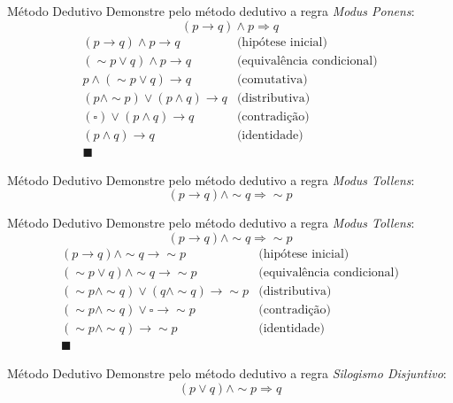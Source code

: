 \begin{frame}[t]{Método Dedutivo}
	Demonstre pelo método dedutivo a regra {\em Modus Ponens}: $$(p \rightarrow q) \wedge p \Rightarrow q$$
	\vskip 0.2cm
	$$\begin{array}{cl}
	(p \rightarrow q) \wedge p \rightarrow q & \mbox{(hipótese inicial)} \\
	(\sim p \vee q) \wedge p \rightarrow q & \mbox{(equivalência condicional)} \\
	p \wedge (\sim p \vee q) \rightarrow q & \mbox{(comutativa)} \\
	(p \wedge \sim p) \vee (p \wedge q) \rightarrow q & \mbox{(distributiva)} \\
	(\square) \vee (p \wedge q) \rightarrow q & \mbox{(contradição)} \\
	(p \wedge q) \rightarrow q & \mbox{(identidade)} \\
	\blacksquare & 
	\end{array}$$
\end{frame}

\begin{frame}[t]{Método Dedutivo}
	Demonstre pelo método dedutivo a regra {\em Modus Tollens}: $$(p \rightarrow q) \wedge \sim q \Rightarrow \sim p$$
\end{frame}

\begin{frame}[t]{Método Dedutivo}
	Demonstre pelo método dedutivo a regra {\em Modus Tollens}: $$(p \rightarrow q) \wedge \sim q \Rightarrow \sim p$$
	\vskip 0.2cm
	$$\begin{array}{cl}
	(p \rightarrow q) \wedge \sim q \rightarrow \sim p & \mbox{(hipótese inicial)} \\
	(\sim p \vee q) \wedge \sim q \rightarrow \sim p & \mbox{(equivalência condicional)} \\
	(\sim p \wedge \sim q) \vee (q \wedge\sim q) \rightarrow\sim p & \mbox{(distributiva)} \\
	(\sim p \wedge\sim q) \vee \square \rightarrow\sim p & \mbox{(contradição)} \\
	(\sim p \wedge\sim q) \rightarrow\sim p & \mbox{(identidade)} \\
	\blacksquare & 
	\end{array}$$
\end{frame}

\begin{frame}[t]{Método Dedutivo}
	Demonstre pelo método dedutivo a regra {\em Silogismo Disjuntivo}: $$(p \vee q) \wedge \sim p \Rightarrow q$$
\end{frame}

